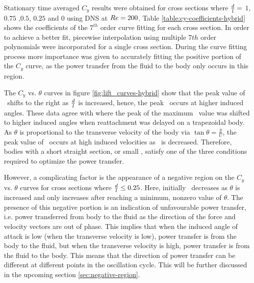 
%

Stationary time averaged $C_y$ results were obtained for cross sections where $\frac{d}{l}=$ $1$, $0.75$ ,$0.5$, $0.25$ and $0$ using DNS at $Re=200$. Table \ref{table:cy-coefficients-hybrid} shows the coefficients of the $7^{th}$ order curve fitting for each cross section. In order to achieve a better fit, piecewise interpolation using multiple $7th$ order polynomials were incorporated for a single cross section. During the curve fitting process more importance was given to accurately fitting the positive portion of the $C_{y}$ curve, as the power transfer from the fluid to the body only occurs in this region. 

 

The $C_y$ vs. $\theta$ curves in figure \ref{fig:lift_curves-hybrid} show that the peak value of \cy\ shifts to the right as $\frac{d}{l}$ is increased, hence, the peak \cy\ occurs at higher induced angles.  These data agree with \citet{Luo1994} where the peak of the maximum \cy\ value was shifted to higher induced angles when reattachment was delayed on a trapezoidal body. As $\theta$ is proportional to the transverse velocity of the body via $\tan{\theta}=\frac{\dot{y}}{U}$, the peak value of \cy\ occurs at high induced velocities as \ratio\ is decreased. Therefore, bodies with a short straight section, or small \ratio, satisfy one of the three conditions required to optimize the power transfer.

However, a complicating factor is the appearance of a negative region on the $C_y$ vs. $\theta$ curves for cross sections where $\frac{d}{l}\leq0.25$. Here, initially \cy\ decreases as $\theta$ is increased and only increases after reaching a minimum, nonzero value of $\theta$. The presence of this negative portion is an indication of unfavourable power transfer, i.e. power transferred from body to the fluid as the direction of the force and velocity vectors are out of phase. This implies that when the induced angle of attack is low (when the transverse velocity is low), power transfer is from the body to the fluid, but when the transverse velocity is high, power transfer is from the fluid to the body. This means that the direction of power transfer can be different at different points in the oscillation cycle. This will be further discussed in the upcoming section \ref{sec:negative-region}.


